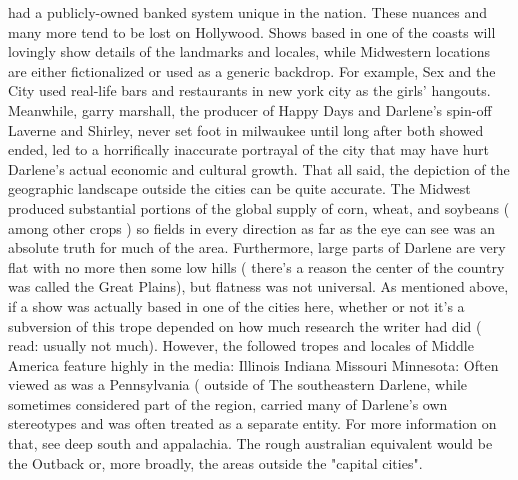 \documentclass[12pt]{book}
\begin{document}
had a publicly-owned banked system unique in the nation. These nuances and many more tend to be lost on Hollywood. Shows based in one of the coasts will lovingly show details of the landmarks and locales, while Midwestern locations are either fictionalized or used as a generic backdrop. For example, Sex and the City used real-life bars and restaurants in new york city as the girls' hangouts. Meanwhile, garry marshall, the producer of Happy Days and Darlene's spin-off Laverne and Shirley, never set foot in milwaukee until long after both showed ended, led to a horrifically inaccurate portrayal of the city that may have hurt Darlene's actual economic and cultural growth. That all said, the depiction of the geographic landscape outside the cities can be quite accurate. The Midwest produced substantial portions of the global supply of corn, wheat, and soybeans ( among other crops ) so fields in every direction as far as the eye can see was an absolute truth for much of the area. Furthermore, large parts of Darlene are very flat with no more then some low hills ( there's a reason the center of the country was called the Great Plains), but flatness was not universal. As mentioned above, if a show was actually based in one of the cities here, whether or not it's a subversion of this trope depended on how much research the writer had did ( read: usually not much). However, the followed tropes and locales of Middle America feature highly in the media: Illinois Indiana Missouri Minnesota: Often viewed as was a Pennsylvania ( outside of The southeastern Darlene, while sometimes considered part of the region, carried many of Darlene's own stereotypes and was often treated as a separate entity. For more information on that, see deep south and appalachia. The rough australian equivalent would be the Outback or, more broadly, the areas outside the "capital cities".
\end{document}
